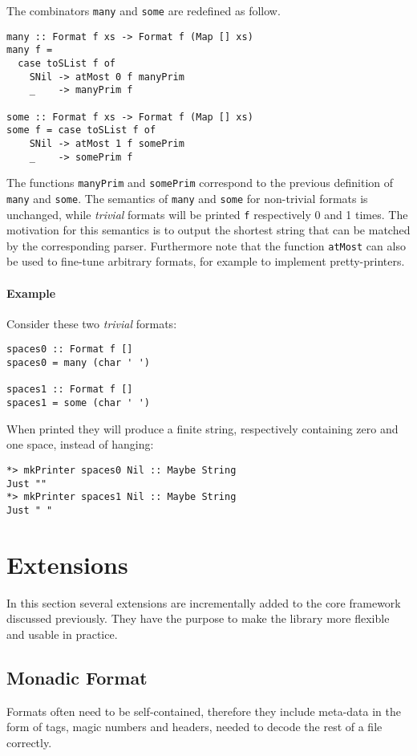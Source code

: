 \documentclass[../Thesis.tex]{subfiles}
\begin{document}
The combinators \texttt{many} and \texttt{some} are redefined as follow.
\begin{verbatim}
many :: Format f xs -> Format f (Map [] xs)
many f = 
  case toSList f of
    SNil -> atMost 0 f manyPrim
    _    -> manyPrim f

some :: Format f xs -> Format f (Map [] xs)
some f = case toSList f of
    SNil -> atMost 1 f somePrim
    _    -> somePrim f
\end{verbatim}

The functions \texttt{manyPrim} and \texttt{somePrim} correspond to the previous definition of \texttt{many} and \texttt{some}.
The semantics of \texttt{many} and \texttt{some} for non-trivial formats is unchanged, while \emph{trivial} formats will be printed \texttt{f} respectively 0 and 1 times.
The motivation for this semantics is to output the shortest string that can be matched by the corresponding parser.
Furthermore note that the function \texttt{atMost} can also be used to fine-tune arbitrary formats, for example to implement pretty-printers.

\paragraph{Example}
Consider these two \emph{trivial} formats:
\begin{verbatim}
spaces0 :: Format f []
spaces0 = many (char ' ')

spaces1 :: Format f []
spaces1 = some (char ' ')
\end{verbatim}

When printed they will produce a finite string, respectively containing zero and
one space, instead of hanging:
\begin{verbatim}
*> mkPrinter spaces0 Nil :: Maybe String
Just ""
*> mkPrinter spaces1 Nil :: Maybe String
Just " "
\end{verbatim}

\section{Extensions}
\label{sec:Extensions}
In this section several extensions are incrementally added to the core framework discussed previously. They have the purpose to make the library 
more flexible and usable in practice.

\subsection{Monadic Format}
\label{subsec:Monadic}
Formats often need to be self-contained, therefore they include meta-data in the form of tags, magic numbers and headers, needed to decode the rest of a file correctly. 
\end{document}
